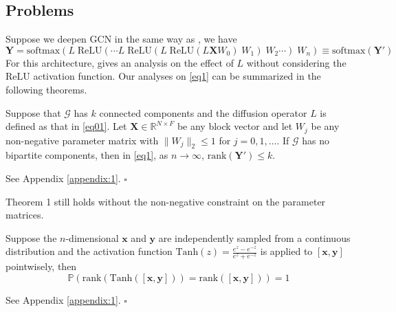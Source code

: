 \documentclass{article}
\newcommand\doubleP{\mathbb{P}}
\newenvironment{theorem}[2][Theorem]{\begin{trivlist}
		\item[\hskip \labelsep {\bfseries #1}\hskip \labelsep {\bfseries #2.}]}{\end{trivlist}}
\newenvironment{conjecture}[2][Conjecture]{\begin{trivlist}
		\item[\hskip \labelsep {\bfseries #1}\hskip \labelsep {\bfseries #2.}]}{\end{trivlist}}
\newenvironment{proof}{{\noindent\it Proof}\quad}{\hfill $\square$\par}
\begin{document}
\subsection{Problems}
Suppose we deepen GCN in the same way as \cite{kipf2016classification, li2018deeper}, we have
\begin{equation}\label{eq1}
\bm{Y} = \text{softmax} ({L} \; \text{ReLU} ( \cdots L \; \text{ReLU} (L\; \text{ReLU} (L \bm{X} W_0 ) \; W_1 )\; W_2 \cdots ) \; W_n ) \equiv  \text{softmax} (\bm{Y'})
\end{equation}
For this architecture, \cite{li2018deeper} gives an analysis on the effect of $L$ without considering the $\text{ReLU}$ activation function. Our analyses on \eqref{eq1} can be summarized in the following theorems.

\begin{theorem} 1
\label{thm1}
Suppose that $\mathcal{G}$ has $k$ connected components and the diffusion operator $L$ is defined as that in \eqref{eq01}. Let $\bm{X} \in \mathbb{R}^{N \times F}$ be any block vector and let $W_j$ be any   non-negative parameter matrix with $\|W_j\|_2\leq 1$ for $j=0,1,\ldots$.
If $\mathcal{G}$ has no bipartite components, then in \eqref{eq1}, as $n \to \infty$, $\text{rank}(\bm{Y'}) \leq k$.
\end{theorem}

\begin{proof}
See Appendix \ref{appendix:1}.
\end{proof}

\begin{conjecture} 1
\label{conj1}
Theorem 1  still holds without the non-negative constraint on the parameter matrices.
\end{conjecture}

\begin{theorem} 2
\label{thm2}
Suppose the $n$-dimensional $\bm{x}$ and   $\bm{y}$ are independently sampled from a continuous distribution and the activation function $\text{Tanh}(z) = \frac{e^z - e^{-z}}{e^z + e^{-z}}$ is applied to $[\bm{x},\bm{y}]$ pointwisely, then
$$\doubleP(\text{rank}\left(\text{Tanh}([\bm{x},\bm{y}])\right) = \text{rank}([\bm{x},\bm{y}])) = 1$$
\end{theorem}

\begin{proof}
See Appendix \ref{appendix:1}.
\end{proof}
\end{document}
